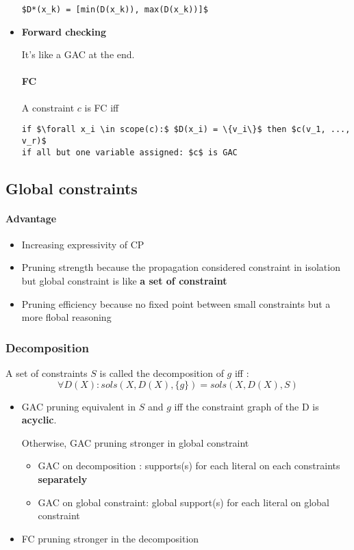 \begin{itemize}
\begin{lstlisting}[mathescape]
$D*(x_k) = [min(D(x_k)), max(D(x_k))]$
        \end{lstlisting}


    \item \textbf{Forward checking}

        It's like a GAC at the end.

        \paragraph{FC} A constraint $c$ is FC iff
        \begin{lstlisting}[mathescape]
if $\forall x_i \in scope(c):$ $D(x_i) = \{v_i\}$ then $c(v_1, ..., v_r)$
if all but one variable assigned: $c$ is GAC
        \end{lstlisting}
\end{itemize}



\subsection{Global constraints}

\paragraph{Advantage}
\begin{itemize}
    \item Increasing expressivity of CP
    \item Pruning strength because the propagation considered constraint in isolation
        but global constraint is like \textbf{a set of constraint}
    \item Pruning efficiency because no fixed point between small constraints
        but a more flobal reasoning
\end{itemize}

\subsubsection{Decomposition}
A set of constraints $S$ is called the decomposition of $g$ iff :
$$ \forall D(X): sols(X, D(X), \{g\}) = sols(X, D(X), S)$$

\begin{itemize}
\item GAC pruning equivalent in $S$ and $g$ iff the constraint
graph of the D is \textbf{acyclic}.

Otherwise, GAC pruning stronger in global constraint

\begin{itemize}
    \item GAC on decomposition : supports(s) for each literal on each constraints
        \textbf{separately}
    \item GAC on global constraint: global support(s) for each literal on global constraint
\end{itemize}


\item FC pruning stronger in the decomposition
    \end{itemize}




